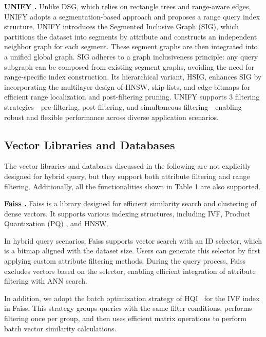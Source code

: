 \documentclass[sigconf, nonacm]{acmart}
\begin{document}
\vspace{1em}
\noindent\textbf{\underline{UNIFY \cite{UNIFY}.}}  
Unlike DSG, which relies on rectangle trees and range-aware edges, UNIFY adopts a segmentation-based approach and proposes a range query index structure. UNIFY introduces the Segmented Inclusive Graph (SIG), which partitions the dataset into segments by attribute and constructs an independent neighbor graph for each segment. These segment graphs are then integrated into a unified global graph. SIG adheres to a graph inclusiveness principle: any query subgraph can be composed from existing segment graphs, avoiding the need for range-specific index construction. Its hierarchical variant, HSIG, enhances SIG by incorporating the multilayer design of HNSW, skip lists, and edge bitmaps for efficient range localization and post-filtering pruning. UNIFY supports 3 filtering strategies—pre-filtering, post-filtering, and  simultaneous filtering—enabling robust and flexible performance across diverse application scenarios.



\subsection{Vector Libraries and Databases}

The vector libraries and databases discussed in the following are not explicitly designed for hybrid query, but they support both attribute filtering and range filtering. Additionally, all the functionalities shown in Table 1 are also supported.

\vspace{1em}
\noindent\textbf{\underline{Faiss \cite{Faiss}.}} Faiss is a library designed for efficient similarity search and clustering of dense vectors. It supports various indexing structures, including IVF, Product Quantization (PQ) \cite{PQ}, and HNSW.

In hybrid query scenarios, Faiss supports vector search with an ID selector, which is a bitmap aligned with the dataset size. Users can generate this selector by first applying custom attribute filtering methods. During the query process, Faiss excludes vectors based on the selector, enabling efficient integration of attribute filtering with ANN search.

In addition, we adopt the batch optimization strategy of HQI~\cite{HQI} for the IVF index in Faiss. This strategy groups queries with the same filter conditions, performs filtering once per group, and then uses efficient matrix operations to perform batch vector similarity calculations.
\end{document}

